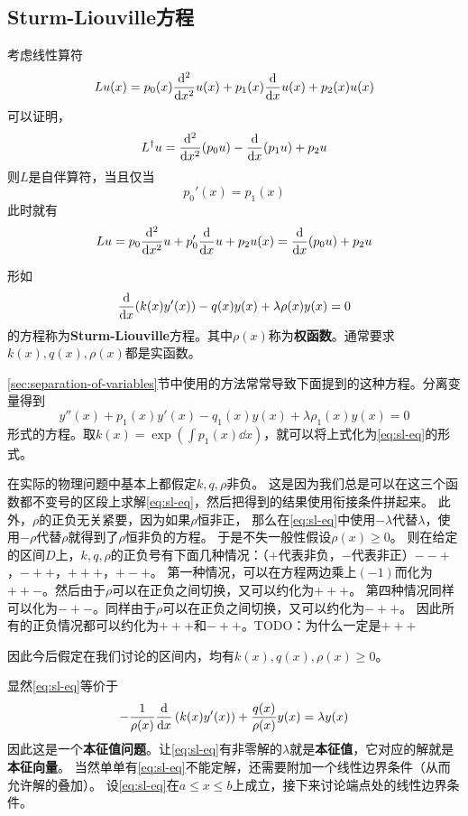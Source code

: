 \documentclass[UTF8]{ctexart}
\begin{document}
\subsection{Sturm-Liouville方程}\label{sec:s-l-eq}

考虑线性算符
\[
    L u(x) = p_0 (x) \dv[2]{x} u(x) + p_1(x) \dv{x} u(x) + p_2(x) u(x)
\]
可以证明，
\[
    L^\dagger u = \dv[2]{x}(p_0 u) - \dv{x} (p_1 u) + p_2 u
\]
则$L$是自伴算符，当且仅当
\[
    p_0'(x) = p_1(x)
\]
此时就有
\[
    L u = p_0 \dv[2]{x} u + p_0' \dv{x} u + p_2 u(x) = \dv{x} (p_0 u) + p_2 u
\]

形如
\begin{equation}
    \dv{x} (k(x) y'(x)) - q(x) y(x) + \lambda \rho(x) y(x) = 0
    \label{eq:sl-eq}
\end{equation}
的方程称为\textbf{Sturm-Liouville}方程。其中$\rho(x)$称为\textbf{权函数}。通常要求$k(x), q(x), \rho(x)$都是实函数。

\ref{sec:separation-of-variables}节中使用的方法常常导致下面提到的这种方程。分离变量得到
\[
    y''(x) + p_1(x) y'(x) - q_1(x) y(x) + \lambda \rho_1(x) y(x) = 0
\]
形式的方程。取$k(x)=\exp \left( \int p_1 (x) \dd x \right)$，就可以将上式化为\eqref{eq:sl-eq}的形式。

在实际的物理问题中基本上都假定$k, q, \rho$非负。
这是因为我们总是可以在这三个函数都不变号的区段上求解\eqref{eq:sl-eq}，然后把得到的结果使用衔接条件拼起来。
此外，$\rho$的正负无关紧要，因为如果$\rho$恒非正，
那么在\eqref{eq:sl-eq}中使用$-\lambda$代替$\lambda$，使用$-\rho$代替$\rho$就得到了$\rho$恒非负的方程。
于是不失一般性假设$\rho(x) \geq 0$。
则在给定的区间$D$上，$k, q, \rho$的正负号有下面几种情况：（$+$代表非负，$-$代表非正）$--+$，$-++$，$+++$，$+-+$。
第一种情况，可以在方程两边乘上$(-1)$而化为$++-$。然后由于$\rho$可以在正负之间切换，又可以约化为$+++$。
第四种情况同样可以化为$-+-$。同样由于$\rho$可以在正负之间切换，又可以约化为$-++$。
因此所有的正负情况都可以约化为$+++$和$-++$。TODO：为什么一定是$+++$

因此今后假定在我们讨论的区间内，均有$k(x), q(x), \rho(x) \geq 0$。

显然\eqref{eq:sl-eq}等价于
\[
    -\frac{1}{\rho(x)} \dv{x} \left(k(x) y'(x)\right) + \frac{q(x)}{\rho(x)} y(x) = \lambda y(x)
\]
因此这是一个\textbf{本征值问题}。让\eqref{eq:sl-eq}有非零解的$\lambda$就是\textbf{本征值}，它对应的解就是\textbf{本征向量}。
当然单单有\eqref{eq:sl-eq}不能定解，还需要附加一个线性边界条件（从而允许解的叠加）。
设\eqref{eq:sl-eq}在$a \leq x \leq b$上成立，接下来讨论端点处的线性边界条件。
\end{document}
